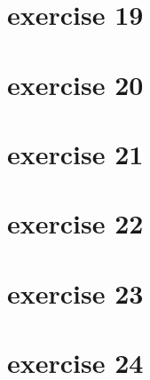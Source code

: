 \documentclass{article}
\begin{document}
\section{exercise 19}
\section{exercise 20}
\section{exercise 21}
\section{exercise 22}
\section{exercise 23}
\section{exercise 24}

\section{}
\end{document}
